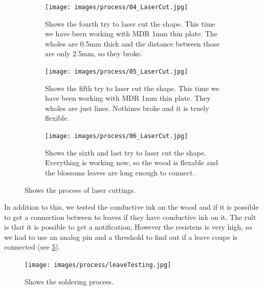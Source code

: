 \documentclass[doc.tex]{subfiles}
\begin{document}
\begin{figure}[H]
            \begin{subfigure}{.45\textwidth}
                \centering
                \texttt{[image: images/process/04\_LaserCut.jpg]}
                \caption{Shows the fourth try to laser cut the shape. This time we have been
                         working with MDR 1mm thin plate. The wholes are 0.5mm thick and the 
                         distance between those are only 2.5mm, so they broke.}
                \label{fig:04_LaserCut}
                \vspace{6mm}
            \end{subfigure}
            \hspace{1mm}
            \begin{subfigure}{.45\textwidth}
                \centering
                \texttt{[image: images/process/05\_LaserCut.jpg]}
                \caption{Shows the fifth try to laser cut the shape. This time we have been
                         working with MDR 1mm thin plate. They wholes are just lines. Nothines
                         broke and it is truely flexible.}
                \label{fig:04_LaserCut}
                \vspace{6mm}
            \end{subfigure}
            \hspace{1mm}
            \begin{subfigure}{.45\textwidth}
                \centering
                \texttt{[image: images/process/06\_LaserCut.jpg]}
                \caption{Shows the sixth and last try to laser cut the shape. Everything is 
                working now, so the wood is flexable and the blossoms leaves are long enough
                to connect. }
                \label{fig:04_LaserCut}
                \vspace{6mm}
            \end{subfigure}
            \caption{Shows the process of laser cuttings.}
            \label{fig:laserCutTests}
        \end{figure}
        \noindent


        In addition to this, we tested the conductive ink on the wood and if it is possible 
        to get a connection between to leaves if they have conductive ink on it. The rult is
        that it is possible to get a notification; However the resistens is very high, so we 
        had to use an analog pin and a threshold to find out if a leave coupe is connected
        (see \ref{fig:leaveConductiveInk}).

        \begin{figure}[h!]
            \centering
            \texttt{[image: images/process/leaveTesting.jpg]}
            \caption{Shows the soldering process.}
            \label{fig:leaveConductiveInk}
        \end{figure}
\end{document}
